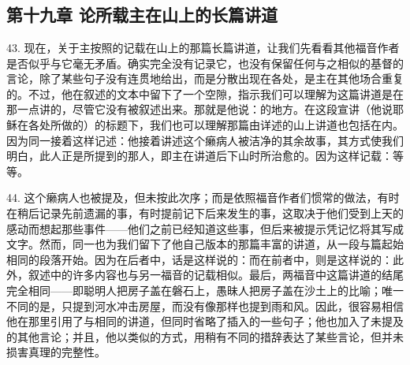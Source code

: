 

\section{}


\subsection{第十九章 论所载主在山上的长篇讲道}

43. 现在，关于主按照的记载在山上的那篇长篇讲道，让我们先看看其他福音作者是否似乎与它毫无矛盾。\newline{}确实完全没有记录它，也没有保留任何与之相似的基督的言论，除了某些句子没有连贯地给出，而是分散出现在各处，是主在其他场合重复的。不过，他在叙述的文本中留下了一个空隙，指示我们可以理解为这篇讲道是在那一点讲的，尽管它没有被叙述出来。那就是他说：的地方。\newline{}在这段宣讲（他说耶稣在各处所做的）的标题下，我们也可以理解那篇由详述的山上讲道也包括在内。因为同一接着这样记述：\newline{}他接着讲述这个癞病人被洁净的其余故事，其方式使我们明白，此人正是所提到的那人，即主在讲道后下山时所治愈的。因为这样记载：等等。\par

44. 这个癞病人也被提及，但未按此次序；而是依照福音作者们惯常的做法，有时在稍后记录先前遗漏的事，有时提前记下后来发生的事，这取决于他们受到上天的感动而想起那些事件——他们之前已经知道这些事，但后来被提示凭记忆将其写成文字。\newline{}然而，同一也为我们留下了他自己版本的那篇丰富的讲道，从一段与篇起始相同的段落开始。\newline{}因为在后者中，话是这样说的：而在前者中，则是这样说的：\newline{}此外，叙述中的许多内容也与另一福音的记载相似。最后，两福音中这篇讲道的结尾完全相同——即聪明人把房子盖在磐石上，愚昧人把房子盖在沙土上的比喻；唯一不同的是，只提到河水冲击房屋，而没有像那样也提到雨和风。因此，很容易相信他在那里引用了与相同的讲道，但同时省略了插入的一些句子；他也加入了未提及的其他言论；并且，他以类似的方式，用稍有不同的措辞表达了某些言论，但并未损害真理的完整性。\par


